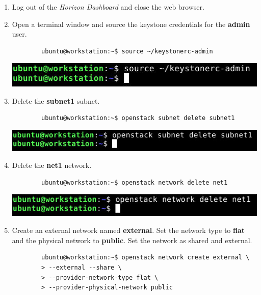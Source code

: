 \documentclass[letterpaper, 12pt]{article}
\begin{document}
\begin{enumerate}
    \item Log out of the \textit{Horizon Dashboard} and close the web browser.
    
    \item Open a terminal window and source the keystone credentials for the \textbf{admin} user.
    \begin{lstlisting}
        ubuntu@workstation:~$ source ~/keystonerc-admin
    \end{lstlisting}

    \begin{center}
        \includegraphics[width=\linewidth]{images/part1/step11.png}
    \end{center}

    \item Delete the \textbf{subnet1} subnet.
    \begin{lstlisting}
        ubuntu@workstation:~$ openstack subnet delete subnet1
    \end{lstlisting}

    \begin{center}
        \includegraphics[width=\linewidth]{images/part1/step12.png}
    \end{center}

    \item Delete the \textbf{net1} network.
    \begin{lstlisting}
        ubuntu@workstation:~$ openstack network delete net1
    \end{lstlisting}

    \begin{center}
        \includegraphics[width=\linewidth]{images/part1/step13.png}
    \end{center}

    \item Create an external network named \textbf{external}. Set the network type to \textbf{flat} and the physical
    network to \textbf{public}. Set the network as shared and external.
    \begin{lstlisting}
        ubuntu@workstation:~$ openstack network create external \
        > --external --share \
        > --provider-network-type flat \
        > --provider-physical-network public
    \end{lstlisting}


\end{enumerate}
\end{document}

